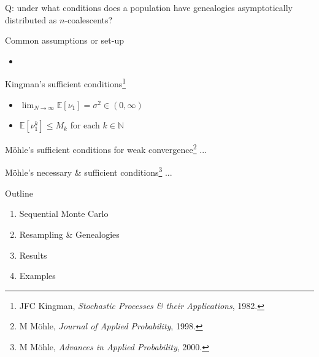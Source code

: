 \documentclass[aspectratio=169]{beamer}
\theoremstyle{definition}
\begin{document}
\begin{frame}
Q: under what conditions does a population have genealogies asymptotically distributed as $n$-coalescents?
\end{frame}


\begin{frame}{Common assumptions or set-up}
\begin{itemize}
\item 
\end{itemize}
\end{frame}


\begin{frame}{Kingman's sufficient conditions\footnote[frame]{JFC Kingman, \textit{Stochastic Processes \& their Applications}, 1982.}}
\begin{itemize}
\item $\lim_{N\to\infty} \mathbb{E}[\nu_1] = \sigma^2 \in (0,\infty)$
\item $\mathbb{E}[\nu_1^k] \leq M_k$ for each $k\in\mathbb{N}$
\end{itemize}
\end{frame}


\begin{frame}{M\"ohle's sufficient conditions for weak convergence\footnote[frame]{M M\"ohle, \textit{Journal of Applied Probability}, 1998.}}
...
\end{frame}


\begin{frame}{M\"ohle's necessary \& sufficient conditions\footnote[frame]{M M\"ohle, \textit{Advances in Applied Probability}, 2000.}}
...
\end{frame}


\begin{frame}
\end{frame}


\begin{frame}{Outline}
\begin{enumerate}
\item Sequential Monte Carlo
\item Resampling \& Genealogies
\item Results
\item Examples
\end{enumerate}
\end{frame}


\end{document}
